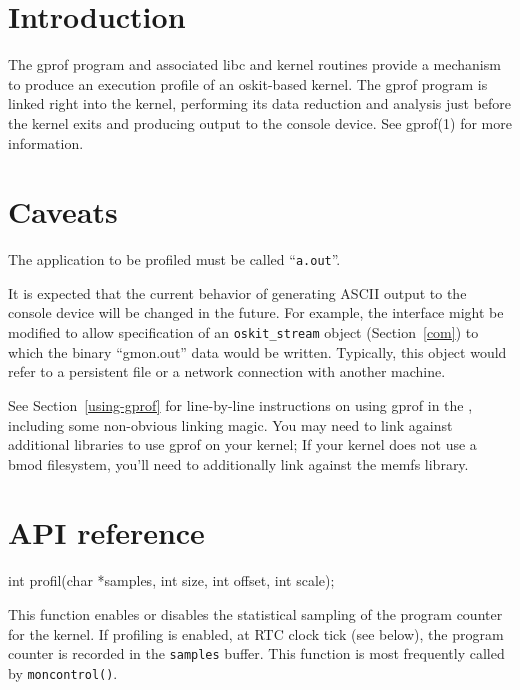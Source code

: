 %
% 
%
\label{gprof}

\section{Introduction}

The gprof program and associated libc and kernel routines provide
a mechanism to produce an execution profile of an oskit-based
kernel.  The gprof program is linked right into the kernel,
performing its data reduction and analysis just before the kernel exits
and producing output to the console device.
See gprof(1) for more information.

\section{Caveats}

The application to be profiled must be called ``\texttt{a.out}''.

It is expected that the current behavior of generating ASCII output to
the console device will be changed in the future.  For example, the interface
might be modified to allow specification of an {\tt oskit_stream} object
(Section~\ref{com}) to which the binary ``gmon.out'' data would be written.
Typically, this object would refer to a persistent file or a network
connection with another machine.

See Section~\ref{using-gprof} for line-by-line instructions on using
gprof in the \oskit{}, including some non-obvious linking magic.
You may need to link against additional libraries to use gprof
on your kernel;  If your kernel does not use a bmod filesystem, you'll
need to additionally link against the memfs library.


\section{API reference}
\begin{apisyn}


	\funcproto int profil(char *samples, int size, int offset, int
				scale);
\end{apisyn}
\begin{apidesc}
	This function enables or disables the statistical sampling of
	the program counter for the kernel.  If profiling is enabled,
	at RTC clock tick (see below), the program counter is recorded
	in the {\tt samples} buffer.  This function is most frequently
	called by {\tt moncontrol()}.
\end{apidesc}

